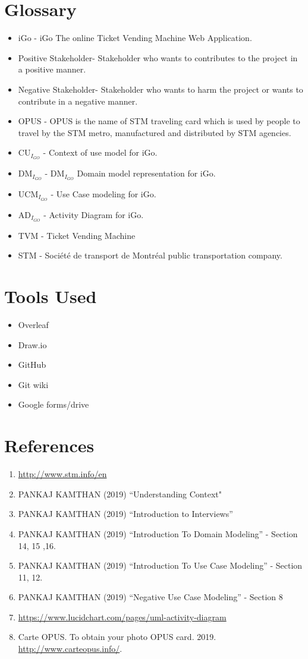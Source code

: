 \documentclass[a4paper, 11pt]{report}
\begin{document}
{\chapter{Glossary}
 \begin{itemize}
\item iGo - iGo	The online Ticket Vending Machine Web Application.
\item Positive Stakeholder- Stakeholder who wants to contributes to the project in a positive manner.
\item Negative Stakeholder- Stakeholder who wants to harm the project or wants to contribute in a negative manner.
\item OPUS - OPUS is the name of STM traveling card which is used by people to travel by the STM metro, manufactured and distributed by STM agencies.
\item CU$_{I_{GO}}$ - Context of use model for iGo.
\item DM$_{I_{GO}}$ - DM$_{I_{GO}}$	Domain model representation for iGo.
\item UCM$_{I_{GO}}$ - Use Case modeling for iGo.
\item AD$_{I_{GO}}$ - Activity Diagram for iGo.
\item TVM - Ticket Vending Machine
\item STM - Société de transport de Montréal public transportation company.
\end{itemize}
\chapter{Tools Used}
 \begin{itemize}
     \item Overleaf
     \item Draw.io
     \item GitHub
     \item Git wiki
     \item Google forms/drive
 \end{itemize}
\chapter{References}
\begin{enumerate}
  \item \url{http://www.stm.info/en}
  \item PANKAJ KAMTHAN (2019) “Understanding Context"
  \item PANKAJ KAMTHAN (2019) “Introduction to Interviews”
  \item PANKAJ KAMTHAN (2019) “Introduction To Domain Modeling” - Section 14, 15 ,16.
  \item PANKAJ KAMTHAN (2019) “Introduction To Use Case Modeling” - Section 11, 12.
  \item PANKAJ KAMTHAN (2019) “Negative Use Case Modeling”  - Section 8
  \item \url{https://www.lucidchart.com/pages/uml-activity-diagram}
  \item Carte OPUS. To obtain your photo OPUS card. 2019. \url{http://www.carteopus.info/}.
\end{enumerate}

}
\end{document}
